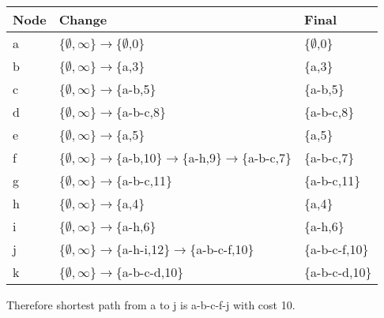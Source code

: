 \documentclass[12pt]{article}
\begin{document}
\begin{center}
\begin{tabular}{ | m{5em} | m{10cm}| m{2.5cm} | } 
  \hline
        \textbf{Node} & \textbf{Change} & \textbf{Final} \\
        \hline
            a  & \{$\emptyset,\infty$\}$\rightarrow$\{$\emptyset$,0\}  & \{$\emptyset$,0\}  \\
        \hline
            b  & \{$\emptyset,\infty$\}$\rightarrow$\{a,3\}  & \{a,3\}  \\
        \hline
            c  & \{$\emptyset,\infty$\}$\rightarrow$\{a-b,5\}  & \{a-b,5\}  \\
        \hline
            d  & \{$\emptyset,\infty$\}$\rightarrow$\{a-b-c,8\}  & \{a-b-c,8\}  \\
        \hline
            e  & \{$\emptyset,\infty$\}$\rightarrow$\{a,5\}  & \{a,5\}  \\
        \hline
            f  & \{$\emptyset,\infty$\}$\rightarrow$\{a-b,10\}$\rightarrow$\{a-h,9\}$\rightarrow$\{a-b-c,7\}  & \{a-b-c,7\}  \\
        \hline
            g  & \{$\emptyset,\infty$\}$\rightarrow$\{a-b-c,11\}  & \{a-b-c,11\}  \\
        \hline
            h  & \{$\emptyset,\infty$\}$\rightarrow$\{a,4\}  & \{a,4\}  \\
        \hline
            i  & \{$\emptyset,\infty$\}$\rightarrow$\{a-h,6\}  & \{a-h,6\}  \\
        \hline
            j  & \{$\emptyset,\infty$\}$\rightarrow$\{a-h-i,12\}$\rightarrow$\{a-b-c-f,10\}  & \{a-b-c-f,10\}  \\
        \hline
            k  & \{$\emptyset,\infty$\}$\rightarrow$\{a-b-c-d,10\}  & \{a-b-c-d,10\}  \\
        \hline
\end{tabular}
\end{center}
Therefore shortest path from a to j is a-b-c-f-j with cost 10.

\newpage
\end{document}
